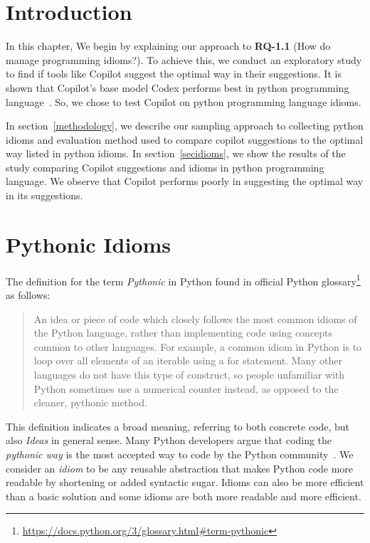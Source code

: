 \label{chapter:idioms}

\section{Introduction}
In this chapter, We begin by explaining our approach to \textbf{RQ-1.1} (How do \cct{} manage programming idioms?). To achieve this, we conduct an exploratory study to find if \cct{} tools like Copilot suggest the optimal way in their suggestions. It is shown that Copilot's base model Codex performs best in python programming language~\cite{copilot}. So, we chose to test Copilot on python programming language idioms.

In section~\ref{methodology}, we describe our sampling approach to collecting python idioms and evaluation method used to compare copilot suggestions to the optimal way listed in python idioms. In section~\ref{secidioms}, we show the results of the study comparing Copilot suggestions and idioms in python programming language. We observe that Copilot performs poorly in suggesting the optimal way in its suggestions. 
\section{Pythonic Idioms}
The definition for the term \emph{Pythonic} in Python found in official Python glossary\footnote{\url{https://docs.python.org/3/glossary.html\#term-pythonic}} as follows:

\begin{quote}
    An idea or piece of code which closely follows the most common idioms of the Python language, rather than implementing code using concepts common to other languages. For example, a common idiom in Python is to loop over all elements of an iterable using a for statement. Many other languages do not have this type of construct, so people unfamiliar with Python sometimes use a numerical counter instead, as opposed to the cleaner, pythonic method.
\end{quote}

This definition indicates a broad meaning, referring to both concrete code, but also \emph{Ideas} in general sense. Many Python developers argue that coding the \emph{pythonic way} is the most accepted way to code by the Python community~\cite{Alexandru2018}. We consider an \emph{idiom} to be any reusable abstraction that makes Python code more readable by shortening or added syntactic sugar. Idioms can also be more efficient than a basic solution and some idioms are both more readable and more efficient.

